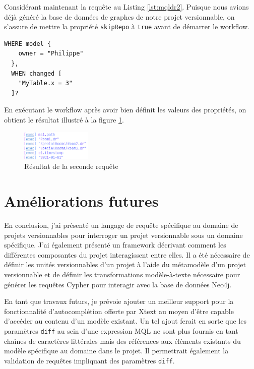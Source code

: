 \documentclass[12pt, titlepage]{article}
\begin{document}
Considérant maintenant la requête au Listing \ref{lst:mqldr2}. Puisque nous
avions déjà généré la base de données de graphes de notre projet versionnable,
on s'assure de mettre la propriété \texttt{skipRepo} à \texttt{true} avant de
démarrer le workflow.

\begin{lstlisting}[style=mql,label=lst:mqldr2,
  caption=MQL Expression specific to Dining Room domain]
  WHERE model {
    owner = "Philippe"
  },
  WHEN changed [
    "MyTable.x = 3"
  ]?
\end{lstlisting}

En exécutant le workflow après avoir bien définit les valeurs des propriétés, on
obtient le résultat illustré à la figure \ref{fig:res2}.

\begin{figure}[h]
  \centering
  \includegraphics[width=0.3\textwidth]{res2.png}
  \caption{Résultat de la seconde requête}
  \label{fig:res2}
\end{figure}

\section*{Améliorations futures}

En conclusion, j'ai présenté un langage de requête spécifique au domaine de
projets versionnables pour interroger un projet versionnable sous un domaine
spécifique. J'ai également présenté un framework décrivant comment les
différentes composantes du projet interagissent entre elles. Il a été nécessaire
de définir les unités versionnables d'un projet à l'aide du métamodèle d'un
projet versionnable et de définir les transformations modèle-à-texte nécessaire
pour générer les requêtes Cypher pour interagir avec la base de données Neo4j.

En tant que travaux futurs, je prévoie ajouter un meilleur support pour la
fonctionnalité d'autocomplétion offerte par Xtext au moyen d'être capable
d'accéder au contenu d'un modèle existant. Un tel ajout ferait en sorte que les
paramètres \texttt{diff} au sein d'une expression MQL ne sont plus fournis en
tant chaînes de caractères littérales mais des références aux éléments existants
du modèle spécifique au domaine dans le projet. Il permettrait également la
validation de requêtes impliquant des paramètres \texttt{diff}.
\end{document}
